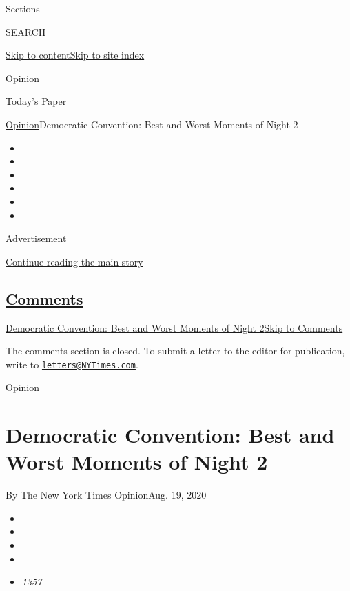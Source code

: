 Sections

SEARCH

\protect\hyperlink{site-content}{Skip to
content}\protect\hyperlink{site-index}{Skip to site index}

\href{https://www.nytimes3xbfgragh.onion/section/opinion}{Opinion}

\href{https://myaccount.nytimes3xbfgragh.onion/auth/login?response_type=cookie\&client_id=vi}{}

\href{https://www.nytimes3xbfgragh.onion/section/todayspaper}{Today's
Paper}

\href{/section/opinion}{Opinion}\textbar{}Democratic Convention: Best
and Worst Moments of Night 2

\begin{itemize}
\item
\item
\item
\item
\item
\item
\end{itemize}

Advertisement

\protect\hyperlink{after-top}{Continue reading the main story}

\hypertarget{comments}{%
\subsection{\texorpdfstring{\protect\hyperlink{commentsContainer}{Comments}}{Comments}}\label{comments}}

\href{}{Democratic Convention: Best and Worst Moments of Night
2}\href{}{Skip to Comments}

The comments section is closed. To submit a letter to the editor for
publication, write to
\href{mailto:letters@NYTimes.com}{\nolinkurl{letters@NYTimes.com}}.

\href{/section/opinion}{Opinion}

\hypertarget{democratic-convention-best-and-worst-moments-of-night-2}{%
\section{Democratic Convention: Best and Worst Moments of Night
2}\label{democratic-convention-best-and-worst-moments-of-night-2}}

By The New York Times OpinionAug. 19, 2020

\begin{itemize}
\item
\item
\item
\item
\item
  \emph{1357}
\end{itemize}

